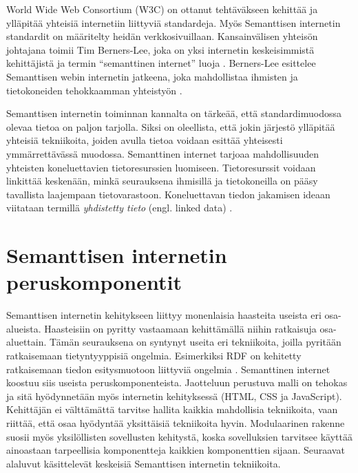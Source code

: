 \documentclass[finnish, 12pt, a4paper, elec, utf8, pdfa, online]{aaltothesis}
\begin{document}
World Wide Web Consortium (W3C) on ottanut tehtäväkseen kehittää ja ylläpitää yhteisiä internetiin liittyviä standardeja. Myös Semanttisen internetin standardit on määritelty heidän verkkosivuillaan. Kansainvälisen yhteisön johtajana toimii Tim Berners-Lee, joka on yksi internetin keskeisimmistä kehittäjistä ja termin ``semanttinen internet'' luoja \cite{W3C}. Berners-Lee esittelee Semanttisen webin internetin jatkeena, joka mahdollistaa ihmisten ja tietokoneiden tehokkaamman yhteistyön \cite{Berners_visio}.

Semanttisen internetin toiminnan kannalta on tärkeää, että standardimuodossa olevaa tietoa on paljon tarjolla. Siksi on oleellista, että jokin järjestö ylläpitää yhteisiä tekniikoita, joiden avulla tietoa voidaan esittää yhteisesti ymmärrettävässä muodossa. Semanttinen internet tarjoaa mahdollisuuden yhteisten koneluettavien tietoresurssien luomiseen. Tietoresurssit voidaan linkittää keskenään, minkä seurauksena ihmisillä ja tietokoneilla on pääsy tavallista laajempaan tietovarastoon. Koneluettavan tiedon jakamisen ideaan viitataan  termillä \textit{yhdistetty tieto} (engl. linked data) \cite{linked_w3c}.

\clearpage
\section{Semanttisen internetin peruskomponentit}
Semanttisen internetin kehitykseen liittyy monenlaisia haasteita useista eri osa-alueista. Haasteisiin on pyritty vastaamaan kehittämällä niihin ratkaisuja osa-aluettain. Tämän seurauksena on syntynyt useita eri tekniikoita, joilla pyritään ratkaisemaan tietyntyyppisiä ongelmia. Esimerkiksi RDF on kehitetty ratkaisemaan tiedon esitysmuotoon liittyviä ongelmia \cite{RDF_specification}. Semanttinen internet koostuu siis useista peruskomponenteista. Jaotteluun perustuva malli on tehokas ja sitä hyödynnetään myös internetin kehityksessä (HTML, CSS ja JavaScript). Kehittäjän ei välttämättä tarvitse hallita kaikkia mahdollisia tekniikoita, vaan riittää, että osaa hyödyntää yksittäisiä tekniikoita hyvin. Modulaarinen rakenne suosii myös yksilöllisten sovellusten kehitystä, koska sovelluksien tarvitsee käyttää ainoastaan tarpeellisia komponentteja kaikkien komponenttien sijaan. Seuraavat alaluvut käsittelevät keskeisiä Semanttisen internetin tekniikoita.
\end{document}
